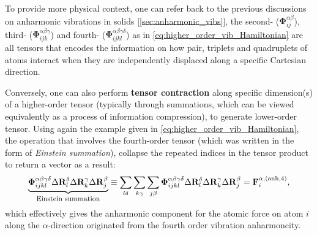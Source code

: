 \begin{myquote}
\hspace{10pt} To provide more physical context, one can refer back to the previous discussions on anharmonic vibrations in solids [\cref{sec:anharmonic_vibs}], the second- ($\boldsymbol{\Phi}_{ij}^{\alpha\beta}$), third-  ($\boldsymbol{\Phi}_{ijk}^{\alpha\beta\gamma}$) and fourth- ($\boldsymbol{\Phi}_{ijkl}^{\alpha\beta\gamma\delta}$) as in \cref{eq:higher_order_vib_Hamiltonian} are all tensors that encodes the information on how pair, triplets and quadruplets of atoms interact when they are independently displaced along a specific Cartesian direction.

\hspace{10pt} Conversely, one can also perform \textbf{tensor contraction} along specific dimension(s) of a higher-order tensor (typically through summations, which can be viewed equivalently as a process of information compression), to generate lower-order tensor. Using again the example given in \cref{eq:higher_order_vib_Hamiltonian}, the operation that involves the fourth-order tensor (which was written in the form of \emph{Einstein summation}), collapse the repeated indices in the tensor product to return a vector as a result:
\begin{equation*}
    \underbrace{\boldsymbol{\Phi}_{ijkl}^{\alpha\beta\gamma\delta}\Delta\mathbf{R}_l^\delta\Delta \mathbf{R}_{k}^{\gamma}\Delta\mathbf{R}_j^{\beta}}_{\mbox{\footnotesize{Einstein summation}}}\equiv\sum_{l\delta}\sum_{k\gamma}\sum_{j\beta}\boldsymbol{\Phi}_{ijkl}^{\alpha\beta\gamma\delta}\Delta\mathbf{R}_l^\delta\Delta \mathbf{R}_{k}^{\gamma}\Delta\mathbf{R}_j^{\beta}=\mathbf{F}_{i}^{\alpha,(\mathrm{anh},4)},
\end{equation*}
which effectively gives the anharmonic component for the atomic force on atom $i$ along the $\alpha$-direction originated from the fourth order vibration anharmoncity.\cite{yang2021altas}
\end{myquote}


%
%


